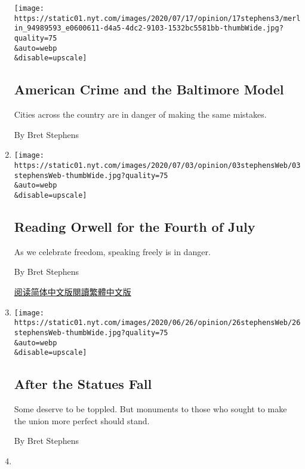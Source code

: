 \begin{enumerate}
  \texttt{[image: https://static01.nyt.com/images/2020/07/17/opinion/17stephens3/merlin\_94989593\_e0600611-d4a5-4dc2-9103-1532bc5581bb-thumbWide.jpg?quality=75\\\&auto=webp\\\&disable=upscale]}

  \hypertarget{american-crime-and-the-baltimore-model}{%
  \subsection{American Crime and the Baltimore
  Model}\label{american-crime-and-the-baltimore-model}}

  Cities across the country are in danger of making the same mistakes.

  By Bret Stephens
\item
  \href{/2020/07/03/opinion/orwell-fourth-of-july.html}{}

  \texttt{[image: https://static01.nyt.com/images/2020/07/03/opinion/03stephensWeb/03stephensWeb-thumbWide.jpg?quality=75\\\&auto=webp\\\&disable=upscale]}

  \hypertarget{reading-orwell-for-the-fourth-of-july}{%
  \subsection{Reading Orwell for the Fourth of
  July}\label{reading-orwell-for-the-fourth-of-july}}

  As we celebrate freedom, speaking freely is in danger.

  By Bret Stephens

  \href{https://cn.nytimes.com/opinion/20200706/orwell-fourth-of-july/}{阅读简体中文版}\href{https://cn.nytimes.com/opinion/20200706/orwell-fourth-of-july/zh-hant/}{閱讀繁體中文版}
\item
  \href{/2020/06/26/opinion/statues-protests.html}{}

  \texttt{[image: https://static01.nyt.com/images/2020/06/26/opinion/26stephensWeb/26stephensWeb-thumbWide.jpg?quality=75\\\&auto=webp\\\&disable=upscale]}

  \hypertarget{after-the-statues-fall}{%
  \subsection{After the Statues Fall}\label{after-the-statues-fall}}

  Some deserve to be toppled. But monuments to those who sought to make
  the union more perfect should stand.

  By Bret Stephens
\item
  \href{/2020/06/19/opinion/bolton-book.html}{}


\end{enumerate}
